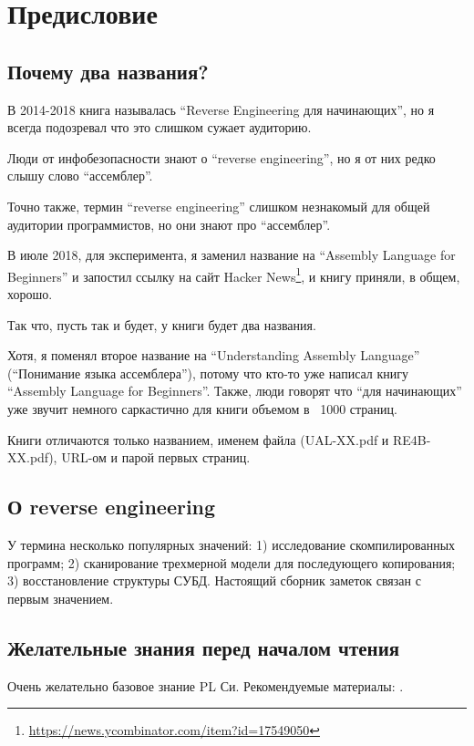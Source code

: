\section*{Предисловие}

\subsection*{Почему два названия?}
\label{TwoTitles}

В 2014-2018 книга называлась ``Reverse Engineering для начинающих'', но я всегда подозревал что это слишком сужает аудиторию.

Люди от инфобезопасности знают о ``reverse engineering'', но я от них редко слышу слово ``ассемблер''.

Точно также, термин ``reverse engineering'' слишком незнакомый для общей аудитории программистов, но они знают про ``ассемблер''.

В июле 2018, для эксперимента, я заменил название на ``Assembly Language for Beginners''
и запостил ссылку на сайт Hacker News\footnote{\url{https://news.ycombinator.com/item?id=17549050}}, и книгу приняли, в общем, хорошо.

Так что, пусть так и будет, у книги будет два названия.

Хотя, я поменял второе название на ``Understanding Assembly Language'' (``Понимание языка ассемблера''), потому что кто-то уже написал книгу ``Assembly Language for Beginners''.
Также, люди говорят что ``для начинающих'' уже звучит немного саркастично для книги объемом в ~1000 страниц.

Книги отличаются только названием, именем файла (UAL-XX.pdf и RE4B-XX.pdf), URL-ом и парой первых страниц.

\subsection*{О reverse engineering}

У термина  несколько популярных значений:
1) исследование скомпилированных
программ; 2) сканирование трехмерной модели для последующего копирования;
3) восстановление структуры СУБД. Настоящий сборник заметок
связан с первым значением.

\subsection*{Желательные знания перед началом чтения}

Очень желательно базовое знание \ac{PL} Си.
Рекомендуемые материалы: .


